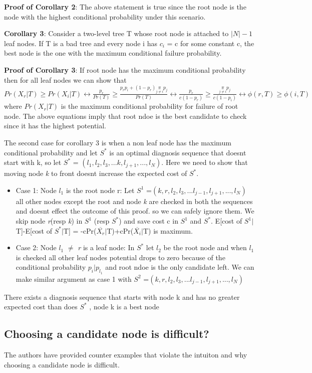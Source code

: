 \documentclass[10pt]{sigplan-proc-varsize}
\begin{document}
{\bf Proof of Corollary 2}: The above statement is true since the root node is the node with the highest conditional probability under this scenario.

{\bf Corollary 3}: Consider a two-level tree T whose root node is attached to $|N|-1$ leaf nodes. If T is a bad tree and every node i has $c_i$ = c for some constant c, the best node is the one with the maximum conditional failure probability.

{\bf Proof of Corollary 3}: If root node has the maximum conditional probability then for all leaf nodes we can show that $Pr(X_r|T) \geq Pr(X_i|T) \leftrightarrow \frac{p_r}{Pr(T)} \geq \frac{p_rp_i+(1-p_r) \underset{j{\neq}i}{\pi}p_j}{Pr(T)} \leftrightarrow \frac{p_r}{c(1-p_r)} \geq \frac{\underset{j{\neq}i}{\pi} p_j}{c(1-p_i)} \leftrightarrow \phi(r,T)\geq\phi(i,T)$ where $Pr(X_r|T)$ is the maximum conditional probability for failure of root node.  The above equations imply that root ndoe is the best candidate to check since it has the highest potential. 

The second case for corollary 3 is when a non leaf node has the  maximum conditional probability and let $S^*$ is an optimal diagnosis sequence that doesnt start with k, so let $S^*$ = $(l_1,l_2,l_3,...k,l_{j+1},...,l_N)$. Here we need to show that moving node {\it k} to front doesnt increase the expected cost of $S^*$.
\begin{itemize}
  \item Case 1: Node $l_1$ is the root node r: Let $S^1$ =$(k,r,l_2,l_3,...l_{j-1},l_{j+1},...,l_N)$ all other nodes except the root and node {\it k} are checked in both the sequences and doesnt effect the outcome of this proof. so we can safely ignore them. We skip node {\it r}(resp {\it k}) in $S^1$ (resp $S^*$) and save cost c in $S^1$ and $S^*$. E[cost of $S^1|$T]-E[cost of $S^*|$T] = -cPr($\overline{X_r}|$T)+cPr($\overline{X_i}|$T) is maximum.
\item Case 2: Node $l_1$ $\neq$ {\it r} is a leaf node: In $S^*$ let $l_2$ be the root node and when $l_1$ is checked all other leaf nodes potential drops to zero because of the conditional probability $p_i|p_{l_1}$ and root ndoe is the only candidate left. We can make similar argument  as case 1 with $S^2$ =$(k,r,l_2,l_3,...l_{j-1},l_{j+1},...,l_N)$
\end{itemize}
There exists a diagnosis sequence that starts with node k and has no greater expected cost than does $S^*$ , node k is a best node

\subsection{Choosing a candidate node is difficult?}
The authors have provided counter examples that violate the intuiton and why choosing a candidate node is difficult. 
\end{document}
